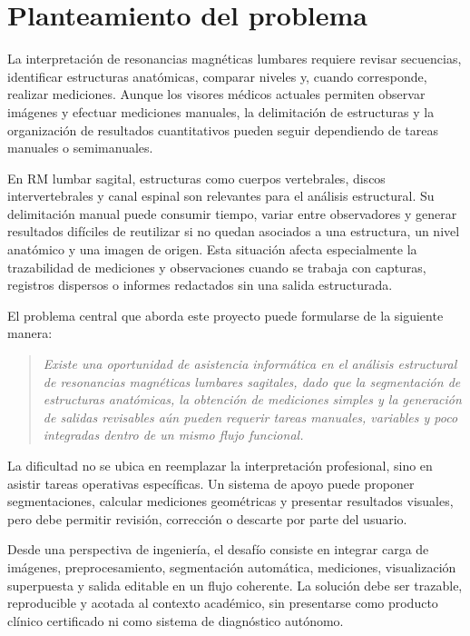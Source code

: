 \chapter{Planteamiento del problema}

La interpretaci\'on de resonancias magn\'eticas lumbares requiere revisar secuencias, identificar estructuras anat\'omicas, comparar niveles y, cuando corresponde, realizar mediciones. Aunque los visores m\'edicos actuales permiten observar im\'agenes y efectuar mediciones manuales, la delimitaci\'on de estructuras y la organizaci\'on de resultados cuantitativos pueden seguir dependiendo de tareas manuales o semimanuales.

En RM lumbar sagital, estructuras como cuerpos vertebrales, discos intervertebrales y canal espinal son relevantes para el an\'alisis estructural. Su delimitaci\'on manual puede consumir tiempo, variar entre observadores y generar resultados dif\'iciles de reutilizar si no quedan asociados a una estructura, un nivel anat\'omico y una imagen de origen. Esta situaci\'on afecta especialmente la trazabilidad de mediciones y observaciones cuando se trabaja con capturas, registros dispersos o informes redactados sin una salida estructurada.

El problema central que aborda este proyecto puede formularse de la siguiente manera:

\begin{quote}
\itshape
Existe una oportunidad de asistencia inform\'atica en el an\'alisis estructural de resonancias magn\'eticas lumbares sagitales, dado que la segmentaci\'on de estructuras anat\'omicas, la obtenci\'on de mediciones simples y la generaci\'on de salidas revisables a\'un pueden requerir tareas manuales, variables y poco integradas dentro de un mismo flujo funcional.
\end{quote}

La dificultad no se ubica en reemplazar la interpretaci\'on profesional, sino en asistir tareas operativas espec\'ificas. Un sistema de apoyo puede proponer segmentaciones, calcular mediciones geom\'etricas y presentar resultados visuales, pero debe permitir revisi\'on, correcci\'on o descarte por parte del usuario.

Desde una perspectiva de ingenier\'ia, el desaf\'io consiste en integrar carga de im\'agenes, preprocesamiento, segmentaci\'on autom\'atica, mediciones, visualizaci\'on superpuesta y salida editable en un flujo coherente. La soluci\'on debe ser trazable, reproducible y acotada al contexto acad\'emico, sin presentarse como producto cl\'inico certificado ni como sistema de diagn\'ostico aut\'onomo.
